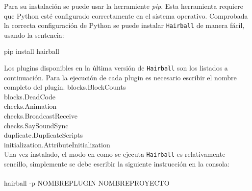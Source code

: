 \documentclass[a4paper, 12pt]{book}
\begin{document}
Para su instalación se puede usar la herramiente \emph{pip}. Esta herramienta
requiere que Python esté configurado correctamente en el sistema operativo.
Comprobada la correcta configuración de Python se puede instalar \texttt{Hairball}
de manera fácil, usando la sentencia:

\begin{center}
pip install hairball
\end{center}

Los plugins disponibles en la última versión de \texttt{Hairball} son los listados
a continuación. Para la ejecución de cada plugin es necesario escribir el 
nombre completo del plugin.
blocks.BlockCounts \\
blocks.DeadCode \\
checks.Animation \\
checks.BroadcastReceive \\
checks.SaySoundSync \\
duplicate.DuplicateScripts \\
initialization.AttributeInitialization \\

Una vez instalado, el modo en como se ejecuta \texttt{Hairball} es relativamente
sencillo, simplemente se debe escribir la siguiente instrucción en la consola: \\ \\
hairball -p NOMBREPLUGIN NOMBREPROYECTO





\cleardoublepage


\end{document}
